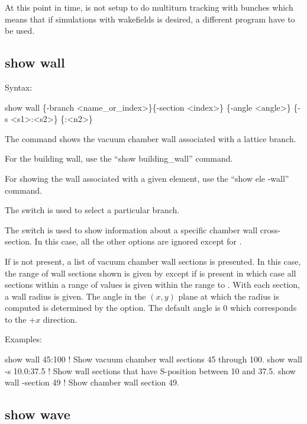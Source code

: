 {{{{{{{{{{At this point in time, \tao is not setup to do multiturn tracking with bunches which means that if
simulations with wakefields is desired, a different program have to be used.


\subsection{show wall}
\label{s:show.wall}

Syntax:
\begin{example}
  show wall \{-branch <name_or_index>\}\{-section <index>\} \{-angle <angle>\}
  \{-s <s1>:<s2>\} \{<n1>:<n2>\}
\end{example}

The  command shows the vacuum chamber wall associated with a lattice branch.

For the building wall, use the ``show building_wall'' command.

For showing the wall associated with a given element, use the ``show ele -wall'' command.

The  switch is used to select a particular branch.

The  switch is used to show information about a specific chamber wall cross-section. In
this case, all the other options are ignored except for .

If  is not present, a list of vacuum chamber wall sections is presented. In this case,
the range of wall sections shown is given by  except if  is present in which
case all sections within a range of  values is given within the range  to
. With each section, a wall radius is given. The angle in the $(x,y)$ plane at which the
radius is computed is determined by the  option. The default angle is 0 which corresponds
to the $+x$ direction.

Examples:
\begin{example}
  show wall 45:100       ! Show vacuum chamber wall sections 45 through 100.
  show wall -s 10.0:37.5 ! Show wall sections that have S-position between 10 and 37.5.
  show wall -section 49  ! Show chamber wall section 49.
\end{example}


\subsection{show wave}
\label{s:show.wave}

}}}}}}}}}}

